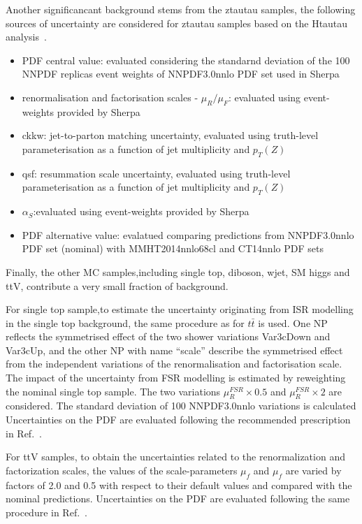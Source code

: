 Another significancant background stems from the ztautau samples, the following sources of uncertainty are considered for ztautau samples based on the Htautau analysis~\cite{Htautau}.
\begin{itemize}
	\item PDF central value: evaluated considering the standarnd deviation of the 100 NNPDF replicas event weights of NNPDF3.0nnlo PDF set used in Sherpa
	\item renormalisation and factorisation scales - $\mu_{R}/\mu_{F}$: evaluated using event-weights provided by Sherpa
	\item ckkw: jet-to-parton matching uncertainty, evaluated using truth-level parameterisation as a function of jet multiplicity and $p_{T}(Z)$
	\item qsf: resummation scale uncertainty, evaluated using truth-level parameterisation as a function of jet multiplicity and $p_{T}(Z)$
	\item $\alpha_{S}$:evaluated using event-weights provided by Sherpa
	\item PDF alternative value: evalatued comparing predictions from NNPDF3.0nnlo PDF set (nominal) with MMHT2014nnlo68cl and CT14nnlo PDF sets
\end{itemize}

Finally, the other MC samples,including single top, diboson, wjet, SM higgs and ttV, contribute a very small fraction of background. 

For single top sample,to estimate the uncertainty originating from ISR modelling in the single top background, the same procedure as for $t\bar{t}$ is used. One NP reflects the symmetrised effect of the two shower variations Var3cDown and Var3cUp, and the other NP with name ``scale'' describe the symmetrised effect from the independent variations of the renormalisation and factorisation scale. The impact of the uncertainty from FSR modelling is estimated by reweighting the nominal single top sample. The two variations $\mu^{FSR}_{R} \times 0.5$ and $\mu^{FSR}_{R} \times 2$ are considered.  The standard deviation of 100 NNPDF3.0nnlo variations is calculated Uncertainties on the PDF are evaluated following the recommended prescription in Ref.~\cite{ttRun2}.

For ttV samples, to obtain the uncertainties related to the renormalization and factorization scales, the values of the scale-parameters $\mu_{f}$ and $\mu_{f}$ are varied by factors of 2.0 and 0.5 with respect to their default values and compared with the nominal predictions. Uncertainties on the PDF are evaluated following the same procedure in Ref.~\cite{ttZRun2}.

